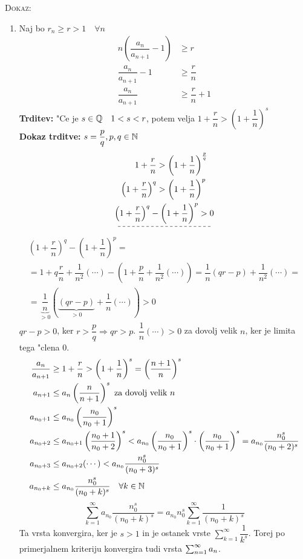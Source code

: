 \textsc{Dokaz:}
\begin{enumerate}[1)]
	\item Naj bo $r_n \geq r > 1 \quad \forall n$
	\begin{align*}
	n\left(\dfrac{a_n}{a_{n+1}} - 1\right) &\geq r \\
	\dfrac{a_n}{a_{n+1}} -1 &\geq \dfrac{r}{n} \\
	\dfrac{a_n}{a_{n+1}} &\geq \dfrac{r}{n} + 1
	\end{align*}
	\textbf{Trditev:} "Ce je $s \in \mathbb{Q} \quad 1 < s < r$, potem velja $1 + \dfrac{r}{n} > \left(1 + \dfrac{1}{n}\right)^s$ \\
	\textbf{Dokaz trditve:} $s = \dfrac{p}{q}, p, q \in \mathbb{N}$
	\begin{gather*}
	\begin{aligned}
	1 + \dfrac{r}{n} &> \left(1+\dfrac{1}{n}\right)^{\frac{p}{q}} \\
	\left(1 + \dfrac{r}{n}\right)^q &> \left(1 + \dfrac{1}{n}\right)^p
	\end{aligned} \\
	\dashuline{\left(1 + \dfrac{r}{n}\right)^q - \left(1 + \dfrac{1}{n}\right)^p > 0}
	\end{gather*}
	\begin{multline*}
		\left(1 + \dfrac{r}{n}\right)^q - \left(1 + \dfrac{1}{n}\right)^p =\\=
		 1 + q\dfrac{r}{n} + \dfrac{1}{n^2}(\cdots) - (1 + \dfrac{p}{n} + \dfrac{1}{n^2}(\cdots)) = \dfrac{1}{n}(qr - p) + \dfrac{1}{n^2}(\cdots) = \\
		 = \underbrace{\dfrac{1}{n}}_{>0}(\underbrace{(qr - p)}_{>0} + \dfrac{1}{n}(\cdots)) > 0
	\end{multline*}
	$qr - p > 0$, ker $r>\dfrac{p}{q} \Rightarrow qr > p$. \quad $\dfrac{1}{n}(\cdots) > 0$ za dovolj velik $n$, ker je limita tega "clena 0.
	\begin{align*}
	\dfrac{a_n}{a_{n+1}} &\geq 1 + \dfrac{r}{n} > \left(1+\dfrac{1}{n}\right)^s = \left(\dfrac{n+1}{n}\right)^s \\
	a_{n+1} &\leq a_n \left(\dfrac{n}{n+1}\right)^s \text{ za dovolj velik $n$} \\
	a_{n_0 +1} &\leq a_{n_0} \left(\dfrac{n_0}{n_0 + 1}\right)^s \\
	a_{n_0 +2} &\leq a_{n_0+1} \left(\dfrac{n_0+1}{n_0 + 2}\right)^s < a_{n_0} \left(\dfrac{n_0}{n_0 + 1}\right)^s \cdot \left(\dfrac{n_0}{n_0 + 1}\right)^s = a_{n_0} \dfrac{n_0^s}{(n_0 + 2)^s} \\
	a_{n_0 + 3} &\leq a_{n_0 + 2}(\cdots) < a_{n_0} \dfrac{n_0^s}{(n_0 + 3)^s} \\
	a_{n_0 + k} &\leq a_{n_0} \dfrac{n_0^s}{(n_0 + k)^s} \quad \forall k \in \mathbb{N}
	\end{align*}
	\begin{equation*}
	\sum_{k=1}^{\infty}a_{n_0}\dfrac{n_0^s}{(n_0 + k)^s} = a_{n_0}n_0^s \sum_{k = 1}^{\infty}\dfrac{1}{(n_0+k)^s}
	\end{equation*}
	Ta vrsta konvergira, ker je $s > 1$ in je ostanek vrste $\sum_{k=1}^{\infty}\dfrac{1}{k^s}$. Torej po primerjalnem kriteriju konvergira tudi vrsta $\sum_{n = 1}^{\infty}a_n$.
	

\end{enumerate}
